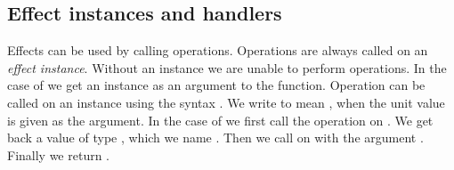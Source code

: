 \subsection{Effect instances and handlers}
\label{subsection:instances}
Effects can be used by calling operations.
Operations are always called on an \emph{effect instance}.
Without an instance we are unable to perform operations.
In the case of  we get an instance as an argument to the function.
Operation can be called on an instance using the syntax .
We write  to mean , when the unit value \ident{()} is given as the argument.
In the case of  we first call the  operation on .
We get back a value of type , which we name .
Then we call  on  with the argument .
Finally we return .

